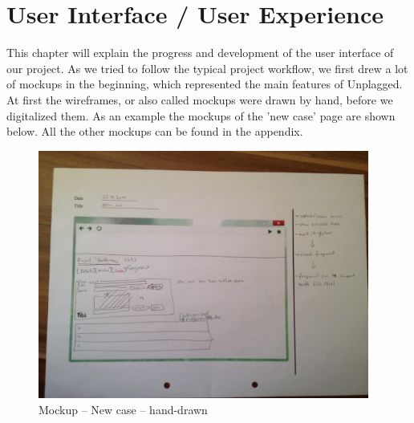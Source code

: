 \section{User Interface / User Experience}

This chapter will explain the progress and development of the user interface of our project. As we tried to follow the typical project workflow, we first drew a lot of mockups in the beginning, which represented the main features of Unplagged. At first the wireframes, or also called mockups were drawn by hand, before we digitalized them. As an example the mockups of the 'new case' page are shown below. All the other mockups can be found in the appendix.

\begin{figure}[htbp]
  \centering
    \includegraphics[width=0.97\textwidth]{mockups/m_new_case.jpg}
  \caption{Mockup -- New case -- hand-drawn}
  \label{fig:mNewCaseMockup}
\end{figure}

